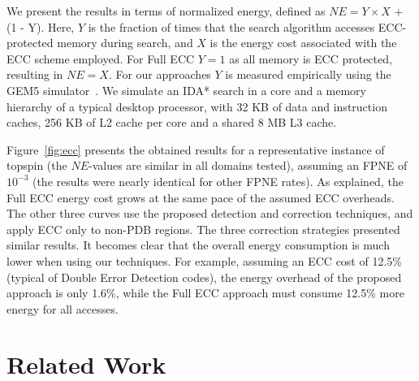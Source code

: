\documentclass[letterpaper]{article}
\begin{document}
We present the results in terms of normalized energy, defined as $NE = Y \times X$ + (1 - Y). Here, $Y$ is the fraction of times that the search algorithm accesses ECC-protected memory during search, and $X$ is the energy cost associated with the ECC scheme employed. For Full ECC $Y = 1$ as all memory is ECC protected, resulting in $NE = X$. For our approaches $Y$ is measured empirically using the GEM5 simulator~\cite{Binkert2011}. We simulate an IDA* search in a core and a memory hierarchy of a typical desktop processor, with 32 KB of data and instruction caches, 256 KB of L2 cache per core and a shared 8 MB L3 cache. 




Figure~\ref{fig:ecc} presents the obtained results for a representative instance of topspin (the $NE$-values are similar in all domains tested), assuming an FPNE of $10^{-3}$ (the results were nearly identical for other FPNE rates). As explained, the Full ECC energy cost grows at the same pace of the assumed ECC overheads. The other three curves use the proposed detection and correction techniques, and apply ECC only to non-PDB regions. The three correction strategies presented similar results.  It becomes clear that the overall energy consumption is much lower when using our techniques. For example, assuming an ECC cost of 12.5\% (typical of Double Error Detection codes), the energy overhead of the proposed approach is only 1.6\%, while the Full ECC approach must consume 12.5\% more energy for all accesses. 



\section{Related Work}
\end{document}

